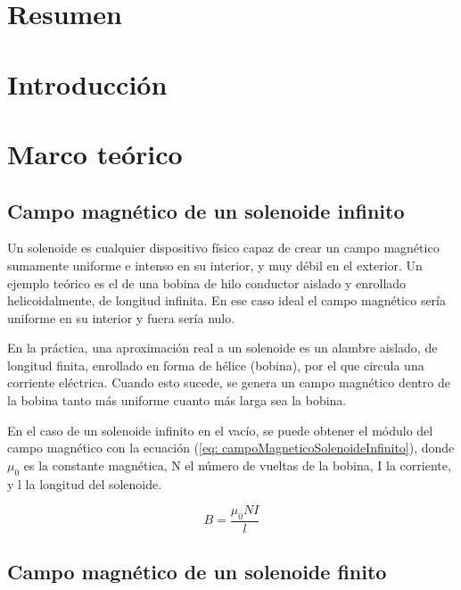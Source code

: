 \documentclass[a4paper,12pt]{article}
\begin{document}
\section*{Resumen}

    

\section*{Introducción}

    

\section*{Marco teórico}

    \subsection*{Campo magnético de un solenoide infinito}

        Un solenoide es cualquier dispositivo físico capaz de crear un campo magnético sumamente uniforme e intenso en su interior, y muy débil en el exterior. Un ejemplo teórico es el de una bobina de hilo conductor aislado y enrollado helicoidalmente, de longitud infinita. En ese caso ideal el campo magnético sería uniforme en su interior y fuera sería nulo.

        En la práctica, una aproximación real a un solenoide es un alambre aislado, de longitud finita, enrollado en forma de hélice (bobina), por el que circula una corriente eléctrica. Cuando esto sucede, se genera un campo magnético dentro de la bobina tanto más uniforme cuanto más larga sea la bobina.

        En el caso de un solenoide infinito en el vacío, se puede obtener el módulo del campo magnético con la ecuación (\ref{eq: campoMagneticoSolenoideInfinito}), donde $\mu_0$ es la constante magnética, N el número de vueltas de la bobina, I la corriente, y l la longitud del solenoide.

        \begin{equation}
            \label{eq: campoMagneticoSolenoideInfinito}
            B = \frac{\mu_0 N I}{l}
        \end{equation}

    \subsection*{Campo magnético de un solenoide finito}
    
\end{document}

